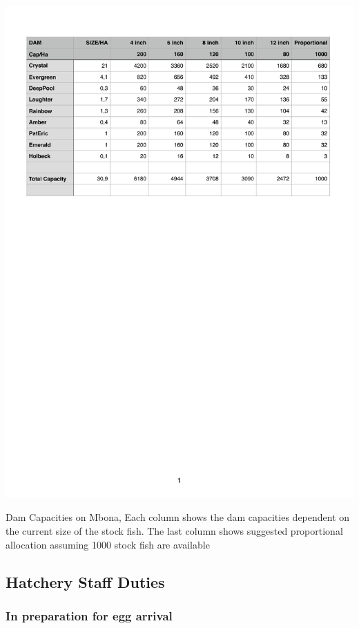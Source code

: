 \begin{table}[H]
  \centering
   \includegraphics[scale = 0.7]{tables/TablesDamCapacity.pdf}
   \caption{Dam Capacities on Mbona, Each column shows the dam capacities dependent on
   the current size of the stock fish. The last column shows suggested proportional allocation
   assuming 1000 stock fish are available}
   \label{tab:TablesDamCapacity}
\end{table}



\subsection{Hatchery Staff Duties}

\subsubsection{In preparation for egg arrival}

